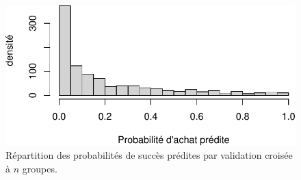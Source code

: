 \documentclass[
  11pt,
  letterpaper,
]{scrbook}
\theoremstyle{definition}
\theoremstyle{remark}
\begin{document}
\begin{figure}[ht!]

{\centering \includegraphics{./05-reglogistique_files/figure-pdf/fig-classification0-1.pdf}

}

\caption{\label{fig-classification0}Répartition des probabilités de
succès prédites par validation croisée à \(n\) groupes.}

\end{figure}
\end{document}
